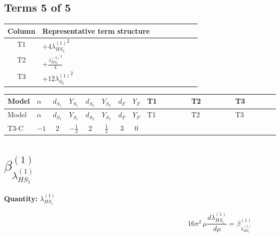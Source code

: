 \documentclass[8pt]{article}
\begin{document}
\begin{landscape}
\subsection*{Terms 5 of 5}
\begin{center}
\begin{tabular}{@{}c >{\raggedright\arraybackslash}p{0.82\linewidth}@{}}
\toprule
Column & Representative term structure \\
\midrule
T1 & \(\displaystyle +4 {\lambda_{HS_2}^{(1)}}^2\) \\
\midrule
T2 & \(\displaystyle +\frac{{\lambda_{HS_2}^{(A)}}^2}{4}\) \\
\midrule
T3 & \(\displaystyle +12 {\lambda_{S_2}^{(1)}}^2\) \\
\midrule
\bottomrule
\end{tabular}
\end{center}
\smallskip
\tiny
\begin{longtable}{@{}llcccccc >{\raggedright\arraybackslash}p{0.21\linewidth} >{\raggedright\arraybackslash}p{0.21\linewidth} >{\raggedright\arraybackslash}p{0.21\linewidth}@{}}
\toprule
Model & $\alpha$ & $d_{S_1}$ & $Y_{S_1}$ & $d_{S_2}$ & $Y_{S_2}$ & $d_F$ & $Y_F$ & T1 & T2 & T3 \\
\midrule
\endfirsthead
\toprule
Model & $\alpha$ & $d_{S_1}$ & $Y_{S_1}$ & $d_{S_2}$ & $Y_{S_2}$ & $d_F$ & $Y_F$ & T1 & T2 & T3 \\
\midrule
\endhead
T3-C & $-1$ & $2$ & $-\frac{1}{2}$ & $2$ & $\frac{1}{2}$ & $3$ & $0$ & \scriptsize\adjustbox{max width=\linewidth}{$\begin{gathered} +4 {\lambda_{HS_2}^{(1)}}^2\end{gathered}$} & \scriptsize\adjustbox{max width=\linewidth}{$\begin{gathered} +\frac{{\lambda_{HS_2}^{(A)}}^2}{4}\end{gathered}$} & \scriptsize\adjustbox{max width=\linewidth}{$\begin{gathered} +12 {\lambda_{S_2}^{(1)}}^2\end{gathered}$} \\
\midrule
\bottomrule
\end{longtable}
\clearpage
\section*{$\beta_{\lambda_{HS_1}^{(1)}}^{(1)}$}
\noindent\textbf{Quantity: }$\lambda_{HS_1}^{(1)}$\par\smallskip
\[16\pi^2\,\mu\frac{d \lambda_{HS_1}^{(1)}}{d\mu}=\beta_{\lambda_{HS_1}^{(1)}}^{(1)}\]

\end{landscape}
\end{document}

